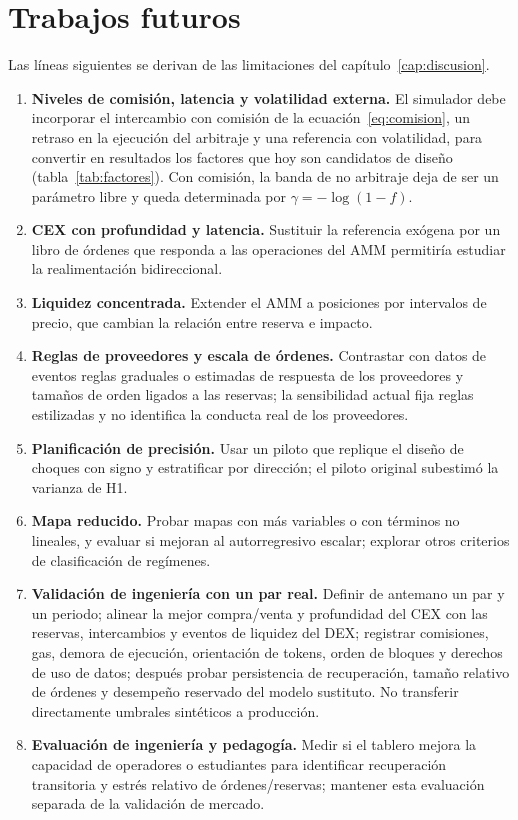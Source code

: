 \chapter{Trabajos futuros}
\label{cap:futuro}

Las líneas siguientes se derivan de las limitaciones del capítulo~\ref{cap:discusion}.

\begin{enumerate}
  \item \textbf{Niveles de comisión, latencia y volatilidad externa.} El simulador debe incorporar el intercambio con comisión de la ecuación~\eqref{eq:comision}, un retraso en la ejecución del arbitraje y una referencia con volatilidad, para convertir en resultados los factores que hoy son candidatos de diseño (tabla~\ref{tab:factores}). Con comisión, la banda de no arbitraje deja de ser un parámetro libre y queda determinada por $\gamma=-\log(1-f)$.
  \item \textbf{CEX con profundidad y latencia.} Sustituir la referencia exógena por un libro de órdenes que responda a las operaciones del AMM permitiría estudiar la realimentación bidireccional.
  \item \textbf{Liquidez concentrada.} Extender el AMM a posiciones por intervalos de precio, que cambian la relación entre reserva e impacto.
  \item \textbf{Reglas de proveedores y escala de órdenes.} Contrastar con datos de eventos reglas graduales o estimadas de respuesta de los proveedores y tamaños de orden ligados a las reservas; la sensibilidad actual fija reglas estilizadas y no identifica la conducta real de los proveedores.
  \item \textbf{Planificación de precisión.} Usar un piloto que replique el diseño de choques con signo y estratificar por dirección; el piloto original subestimó la varianza de H1.
  \item \textbf{Mapa reducido.} Probar mapas con más variables o con términos no lineales, y evaluar si mejoran al autorregresivo escalar; explorar otros criterios de clasificación de regímenes.
  \item \textbf{Validación de ingeniería con un par real.} Definir de antemano un par y un periodo; alinear la mejor compra/venta y profundidad del CEX con las reservas, intercambios y eventos de liquidez del DEX; registrar comisiones, gas, demora de ejecución, orientación de tokens, orden de bloques y derechos de uso de datos; después probar persistencia de recuperación, tamaño relativo de órdenes y desempeño reservado del modelo sustituto. No transferir directamente umbrales sintéticos a producción.
  \item \textbf{Evaluación de ingeniería y pedagogía.} Medir si el tablero mejora la capacidad de operadores o estudiantes para identificar recuperación transitoria y estrés relativo de órdenes/reservas; mantener esta evaluación separada de la validación de mercado.
\end{enumerate}
